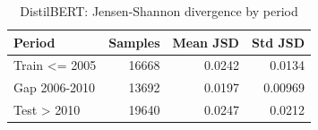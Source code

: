 \begin{table}[ht]
\centering
\caption{DistilBERT: Jensen-Shannon divergence by period}
\label{tab:distilbert_period_jsd_summary}
\begin{tabular}{lrrr}
\toprule
Period & Samples & Mean JSD & Std JSD \\
\midrule
Train <= 2005 & 16668 & 0.0242 & 0.0134 \\
Gap 2006-2010 & 13692 & 0.0197 & 0.00969 \\
Test > 2010 & 19640 & 0.0247 & 0.0212 \\
\bottomrule
\end{tabular}
\end{table}
